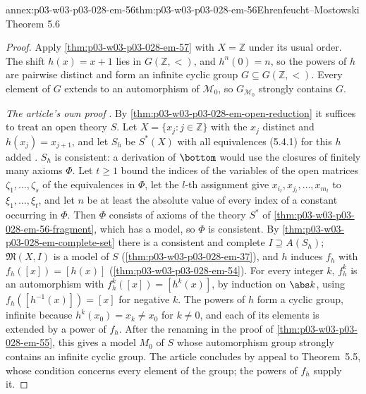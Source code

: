 \begin{annexitem}{annex:p03-w03-p03-028-em-56}{thm:p03-w03-p03-028-em-56}{Ehrenfeucht--Mostowski Theorem 5.6}
\begin{proof}
Apply \cref{thm:p03-w03-p03-028-em-57} with \(X=\mathbb Z\) under its
usual order.  The shift \(h(x)=x+1\) lies in \(G(\mathbb Z,<)\), and
\(h^n(0)=n\), so the powers of \(h\) are pairwise distinct and form an
infinite cyclic group \(G\subseteq G(\mathbb Z,<)\).  Every element of
\(G\) extends to an automorphism of \(\mathcal M_0\), so
\(G_{\mathcal M_0}\) strongly contains \(G\).

\emph{The article's own proof} \cite[pp.~60--62]{EhrenfeuchtMostowski1956}.  By
\cref{thm:p03-w03-p03-028-em-open-reduction} it suffices to treat an open
theory \(S\).  Let \(X=\{x_j:j\in\mathbb Z\}\) with the \(x_j\) distinct and
\(h(x_j)=x_{j+1}\), and let \(S_h\) be \(S^*(X)\) with all equivalences
(5.4.1) for this \(h\) added
\cite[p.~60]{EhrenfeuchtMostowski1956}.  \(S_h\) is consistent: a derivation of \(\bottom\) would
use the closures of finitely many axioms \(\Phi\).  Let \(t\geq1\) bound the
indices of the variables of the open matrices \(\zeta_1,\ldots,\zeta_s\) of the
equivalences in \(\Phi\), let the \(l\)-th assignment give
\(x_{i_l},x_{j_l},\ldots,x_{m_l}\) to \(\xi_1,\ldots,\xi_t\), and let \(n\) be at
least the absolute value of every index of a constant occurring in \(\Phi\).
Then \(\Phi\) consists of axioms of the theory \(S^*\) of
\cref{thm:p03-w03-p03-028-em-56-fragment}, which has a model, so \(\Phi\) is
consistent.  By \cref{thm:p03-w03-p03-028-em-complete-set} there is a
consistent and complete \(I\supseteq A(S_h)\); \(\mathfrak M(X,I)\) is a model
of \(S\) (\cref{thm:p03-w03-p03-028-em-37}), and \(h\) induces \(f_h\) with
\(f_h([x])=[h(x)]\) (\cref{thm:p03-w03-p03-028-em-54}).  For every integer
\(k\), \(f_h^k\) is an automorphism with \(f_h^k([x])=[h^k(x)]\), by induction
on \(\abs k\), using \(f_h([h^{-1}(x)])=[x]\) for negative \(k\).  The powers of
\(h\) form a cyclic group, infinite because \(h^k(x_0)=x_k\neq x_0\) for
\(k\neq0\), and each of its elements is extended by a power of \(f_h\).  After
the renaming in the proof of \cref{thm:p03-w03-p03-028-em-55}, this gives a
model \(M_0\) of \(S\) whose automorphism group strongly contains an infinite
cyclic group.  The article concludes by appeal to Theorem~5.5, whose condition
concerns every element of the group; the powers of \(f_h\) supply it.
\end{proof}
\end{annexitem}

